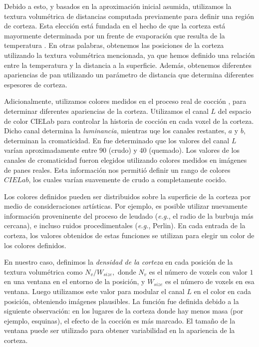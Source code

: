 Debido a esto, y basados en la aproximación inicial asumida, utilizamos la textura volumétrica de distancias computada previamente para definir una región de corteza.
Esta elección está fundada en el hecho de que la corteza está mayormente determinada por un frente de evaporación que resulta de la temperatura \cite{Jefferson2007}.
En otras palabras, obtenemos las posiciones de la corteza utilizando la textura volumétrica mencionada, ya que hemos definido una relación entre la temperatura y la distancia a la superficie.
Además, obtenemos diferentes apariencias de pan utilizando un parámetro de distancia que determina diferentes espesores de corteza.

Adicionalmente, utilizamos colores medidos en el proceso real de cocción \cite{Purlis2009}, para determinar diferentes apariencias de la corteza.
Utilizamos el canal $L$ del espacio de color CIELab \cite{Hunter58} para controlar la historia de cocción en cada voxel de la corteza.
Dicho canal determina la {\em luminancia}, mientras uqe los canales restantes, $a$ y $b$, determinan la cromaticidad.
En \cite{Purlis2009} fue determinado que los valores del canal $L$ varían aproximadamente entre $90$ (crudo) y $40$ (quemado).
Los valores de los canales de cromaticidad fueron elegidos utilizando colores medidos en imágenes de panes reales.
Esta información nos permitió definir un rango de colores $CIELab$, los cuales varían suavemente de crudo a completamente cocido. 

Los colores definidos pueden ser distribuidos sobre la superficie de la corteza por medio de consideraciones artísticas.
Por ejemplo, es posible utilizar nuevamente información proveninente del proceso de leudado ({\em e.g.}, el radio de la burbuja más cercana), e incluso ruidos procedimentales ({\em e.g.}, Perlin).
En cada entrada de la corteza, los valores obtenidos de estas funciones se utilizan para elegir un color de los colores definidos.

En nuestro caso, definimos la {\em densidad de la corteza} en cada posición de la textura volumétrica como $N_{v} / W_{size},$ donde $N_{v}$ es el número de voxels con valor $1$ en una ventana en el entorno de la posición, y $W_{size}$ es el número de voxels en esa ventana.
Luego utilizamos este valor para modular el canal $L$ en el color en cada posición, obteniendo imágenes plausibles.
La función fue definida debido a la siguiente observación: en los lugares de la corteza donde hay menos masa (por ejemplo, esquinas), el efecto de la cocción es más marcado.
El tamaño de la ventana puede ser utilizado para obtener variabilidad en la apariencia de la corteza.

